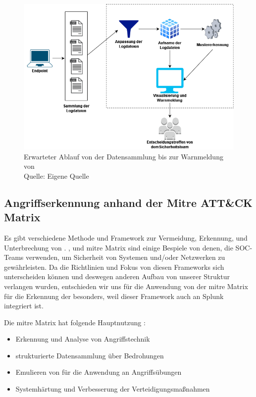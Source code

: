 \begin{figure}[H]
   \centering
   \includegraphics[width=1\textwidth]{assets/Ablauf_grafana.drawio.png}
   \caption{Erwarteter Ablauf von der Datensammlung bis zur Warnmeldung von  \\Quelle: Eigene Quelle}
   \centering
\end{figure}

\subsection{Angriffserkennung anhand der Mitre ATT\&CK Matrix\textregistered}
Es gibt verschiedene Methode und Framework zur Vermeidung, Erkennung, und Unterbrechung von . ,  und \gls{mitre} Matrix sind einige Bespiele von denen, die \gls{SOC}-Teams verwenden, um Sicherheit von Systemen und/oder Netzwerken zu gewährleisten. Da die Richtlinien und Fokus von diesen Frameworks sich unterscheiden können und deswegen anderen Aufbau von unserer Struktur verlangen wurden, entschieden wir uns für die Anwendung von der \gls{mitre} Matrix für die Erkennung der  besonders, weil dieser Framework auch an Splunk integriert ist.

Die \gls{mitre} Matrix hat folgende Hauptnutzung \citep{Mitre_Started}:

{
\begin{itemize}[noitemsep]
   \item Erkennung und Analyse von Angriffstechnik
   \item	strukturierte Datensammlung über Bedrohungen
   \item	Emulieren von  für die Anwendung an Angriffsübungen
   \item	Systemhärtung und Verbesserung der Verteidigungsmaßnahmen
\end{itemize}
}

